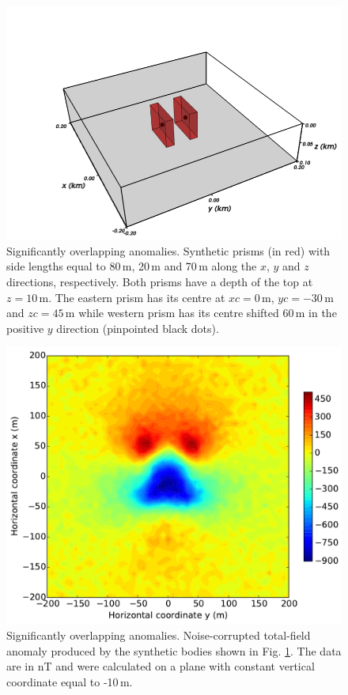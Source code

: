 \documentclass[journal abbreviation, npg]{copernicus}
\begin{document}
\begin{figure}[t]
\includegraphics[width=120mm]{Figures/npgd-2014-0069-f08}
\caption{Significantly overlapping anomalies. Synthetic prisms
(in red) with side lengths
equal to 80\,\unit{m}, 20\,\unit{m} and 70\,\unit{m} along
the $x$, $y$ and $z$ directions, respectively. Both prisms have a depth
of the top at $z = 10$\,\unit{m}. The eastern prism has its centre at 
$xc = 0$\,\unit{m}, $yc = -30$\,\unit{m} and $zc = 45$\,\unit{m} while
western prism has its centre shifted 60\,\unit{m} in the positive $y$ 
direction (pinpointed black dots).}
\label{fig:overlapping-prisms}
\end{figure}

\begin{figure}[t]
\includegraphics[width=120mm]{Figures/npgd-2014-0069-f09}
\caption{Significantly overlapping anomalies. Noise-corrupted 
total-field anomaly produced by the synthetic bodies shown in 
Fig. \ref{fig:overlapping-prisms}. The data are in nT and were
calculated on a plane with constant vertical coordinate equal to
-10\,\unit{m}.}
\label{fig:overlapping-prisms-data}
\end{figure}
\end{document}
